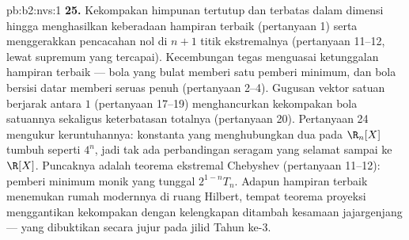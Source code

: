 \begin{solution}{pb:b2:nvs:1}
\textbf{25.} Kekompakan himpunan tertutup dan terbatas dalam dimensi
hingga menghasilkan keberadaan hampiran terbaik (pertanyaan
1) serta menggerakkan pencacahan nol di $n + 1$ titik ekstremalnya
(pertanyaan 11--12, lewat supremum yang tercapai). Kecembungan tegas
menguasai ketunggalan hampiran terbaik --- bola yang bulat memberi satu
pemberi minimum, dan bola bersisi datar memberi seruas penuh (pertanyaan
2--4). Gugusan vektor satuan berjarak antara
$1$ (pertanyaan 17--19) menghancurkan kekompakan bola satuannya
sekaligus keterbatasan totalnya (pertanyaan 20). Pertanyaan 24
mengukur keruntuhannya: konstanta yang menghubungkan dua  pada
$\R_n[X]$ tumbuh seperti $4^n$, jadi tak ada perbandingan seragam yang
selamat sampai ke $\R[X]$. Puncaknya adalah teorema ekstremal
Chebyshev (pertanyaan 11--12): pemberi minimum monik yang tunggal
$2^{1-n}T_n$. Adapun hampiran terbaik menemukan rumah modernnya di
ruang Hilbert, tempat teorema proyeksi menggantikan
kekompakan dengan kelengkapan ditambah kesamaan jajargenjang ---
yang dibuktikan secara jujur pada jilid Tahun ke-3.

\end{solution}
